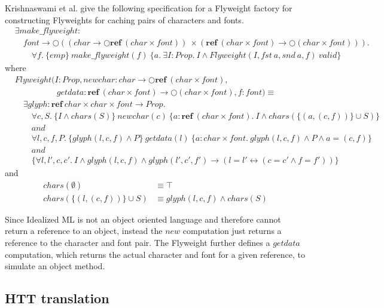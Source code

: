 \documentclass[a4paper,english]{article}
\newcommand{\PROP}[0]{Prop}
\newcommand{\MONAD}[0]{\bigcirc}
\newcommand{\AND}[0]{and}
\newcommand{\REF}[0]{\mathbf{ref}}
\newcommand{\VALID}[0]{valid}
\begin{document}
Krishnaswami et al. give the following specification for a Flyweight factory
for constructing Flyweights for caching pairs of characters and fonts. 
\begin{align*}
&\exists make\_flyweight:\\
&\quad font \rightarrow \MONAD ((char \rightarrow \MONAD \REF\ (char \times font))\ \times (\REF\ (char \times font) \rightarrow \MONAD (char \times font))).\\
&\quad\quad \forall f.\ \{ emp \}\ make\_flyweight(f)\ \{ a.\ \exists I : \PROP.\ I \land Flyweight(I, fst\ a, snd\ a, f)\ \VALID \}
\end{align*}
where
\begin{align*}
&Flyweight(I : \PROP, newchar : char \rightarrow \MONAD \REF\ (char \times font),\\
&\quad\quad\quad\quad\quad getdata : \REF\ (char \times font) \rightarrow \MONAD(char \times font), f : font) \equiv\\
&\quad\exists glyph : \REF\ char \times char \times font \rightarrow \PROP.\\
&\quad\quad\forall c, S.\ \{ I \land chars(S) \}\ newchar(c)\ \{ a : \REF\ (char \times font).\ I \land chars(\{(a, (c, f))\} \cup S) \}\\
&\quad\quad\AND\\
&\quad\quad\forall l, c, f, P.\ \{ glyph(l, c, f) \land P \}\ getdata(l)\ \{ a : char \times font.\ glyph(l, c, f) \land P \land a = (c, f) \}\\
&\quad\quad\AND\\
&\quad\quad\{ \forall l, l', c, c'.\ I \land glyph(l, c, f) \land glyph(l', c', f') \rightarrow (l = l' \leftrightarrow (c = c' \land f = f')) \}
\end{align*}
and
\begin{align*}
chars(\emptyset) &\equiv \top\\
chars(\{ (l, (c, f)) \} \cup S) &\equiv glyph(l, c, f) \land chars(S)
\end{align*}

Since Idealized ML is not an object oriented language and therefore cannot
return a reference to an object, instead the $new$ computation just returns a
reference to the character and font pair. The Flyweight further defines a
$getdata$ computation, which returns the actual character and font for a given
reference, to simulate an object method.

\subsection{HTT translation}
\end{document}
